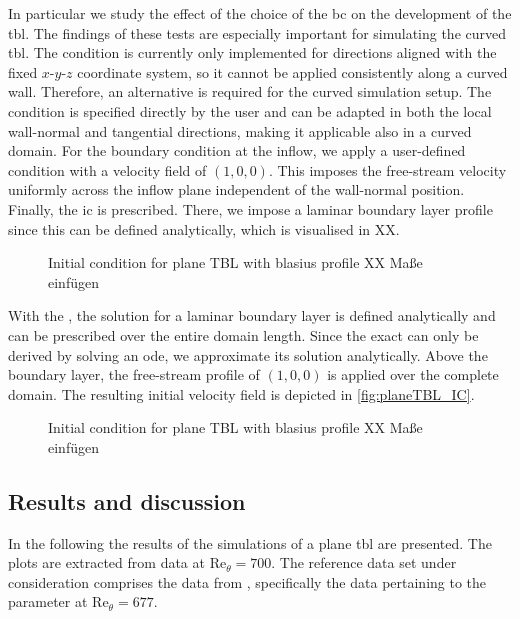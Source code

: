 In particular we study  the effect of  the choice of the \acrshort{bc} on the development of the \acrshort{tbl}.
The findings of these tests are especially important for simulating the curved \acrshort{tbl}.
The  condition is currently only implemented for directions aligned with the fixed $x\text{-}y\text{-}z$  coordinate system, so it cannot be applied consistently along a curved wall.
Therefore,  an alternative is required for  the curved simulation setup.
The  condition is specified directly by the user and can be adapted in both the local wall-normal and tangential directions, making it applicable also in a curved domain.
For the boundary condition at the inflow, we apply a user-defined  condition with a velocity field of $(1, 0 ,0)$.
This imposes the free-stream velocity uniformly across the inflow plane independent of the wall-normal position.
Finally, the \acrshort{ic} is prescribed.
There, we impose a laminar boundary layer profile since this can be defined analytically, which is visualised in XX.
\\[-15pt]
\begin{figure}[H]
    \centering
    
    \caption{Initial condition for plane TBL with blasius profile XX Maße einfügen}
    \label{fig:BlasiusIC}
\end{figure}


With the , the solution for a laminar boundary layer is defined analytically and can be prescribed over the entire domain length. 
Since the exact  can only be derived by solving an \acrfull{ode}, we approximate its solution analytically.
Above the boundary layer, the free-stream profile of $(1, 0, 0)$ is applied over the complete domain.
The resulting initial velocity field is depicted in \autoref{fig:planeTBL_IC}.

\begin{figure}[H]
    \centering
    
    \caption{Initial condition for plane TBL with blasius profile XX Maße einfügen}
    \label{fig:planeTBL_IC}
\end{figure}

\subsection{Results and discussion} \label{subsec:planeTBLResults}
In the following the results of the simulations of a plane \acrshort{tbl} are presented.
The plots are extracted from data at $\mathrm{Re}_{\theta} = 700$.
The reference data set under consideration comprises  the data from \citet{schlatter_assessment_2010},  specifically the data pertaining to the parameter at $\mathrm{Re}_{\theta} = 677$.

